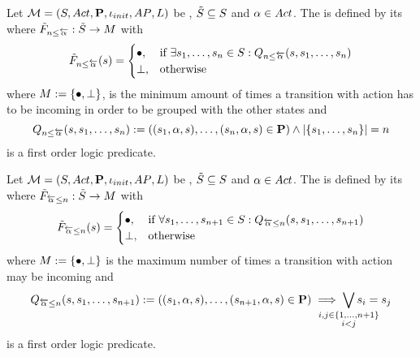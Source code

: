 \documentclass[preview]{standalone}
\begin{document}
\begin{definition}
	Let ${{{\mathcal{M}}}} = {{({S}, {Act}, {\textbf{P}}, {\iota_{init}}, {AP}, {L})}}$ be \achgphN, ${\tilde{{S}}} \subseteq {S}$ and ${\alpha} \in {Act}$. The \viewN \viewmininaction is defined by its \grpfctN \gfctmininaction where ${{\tilde{F}_{{{n}\leq{\overleftarrow{\ensuremath{{\alpha}}}}}}}} : {\tilde{{S}}} \to {\ensuremath{{M}}}$ with
	\[
	{{\tilde{F}_{{{n}\leq{\overleftarrow{\ensuremath{{\alpha}}}}}}}}({s}) =
	\begin{cases}
			{\bullet},				& \text{if } \exists {s}_1, \dots, {s}_{n} \in {S}: {Q_{{n}\leq{\overleftarrow{\ensuremath{{\alpha}}}}}({s},{s}_1, \dots, {s}_{{n}})}\\
			{\bot},     	& \text{otherwise}
		\end{cases}
	\]
	where ${{M}} := {\{{\bullet}, {\bot}\}}$,
	 is the minimum amount of times a transition with action \action has to be incoming in order to be grouped with the other states and
	\[
	{Q_{{n}\leq{\overleftarrow{\ensuremath{{\alpha}}}}}({s},{s}_1, \dots, {s}_{{n}})} := (({s}_1, {\alpha}, {s}), \dots, ({s}_{n}, {\alpha}, {s}) \in {\ensuremath{{\textbf{P}}}}) \land |\{{s}_1, \dots, {s}_{n}\}| = {n}
	\]
	is a first order logic predicate.
	\label{def:viewmaxinaction}
\end{definition}

\begin{definition}
	Let ${{{\mathcal{M}}}} = {{({S}, {Act}, {\textbf{P}}, {\iota_{init}}, {AP}, {L})}}$ be \achgphN, ${\tilde{{S}}} \subseteq {S}$ and ${\alpha} \in {Act}$. The \viewN \viewmaxinaction is defined by its \grpfctN \gfctmaxinaction where ${{\tilde{F}_{{{\overleftarrow{{\alpha}}}\leq{n}}}}} : {\tilde{{S}}} \to {\ensuremath{{M}}}$ with
	\[
	{{\tilde{F}_{{{\overleftarrow{{\alpha}}}\leq{n}}}}}({s}) =
	\begin{cases}
			{\bullet},				& \text{if } \forall {s}_1, \dots, {s}_{{n}+1} \in {S}: {Q_{{\overleftarrow{{\alpha}}}\leq{n}}({s},{s}_1, \dots, {s}_{{n}+1})} \\
			{\bot},     	& \text{otherwise}
		\end{cases}
	\]	
	where ${{M}} := {\{{\bullet}, {\bot}\}}$
	 is the maximum number of times a transition with action \action may be incoming and 
	\[
	\predmaxinact := ((\state_1, \action, \state), \dots, (\state_{\numinact+1}, \action, \state) \in \trans) \implies \bigvee_{\mathclap{\substack{i,j \in \{1,\dots, \numinact+1\} \\ i < j}}} \state_i = \state_j
	\]
	is a first order logic predicate.
\end{definition}
\end{document}
